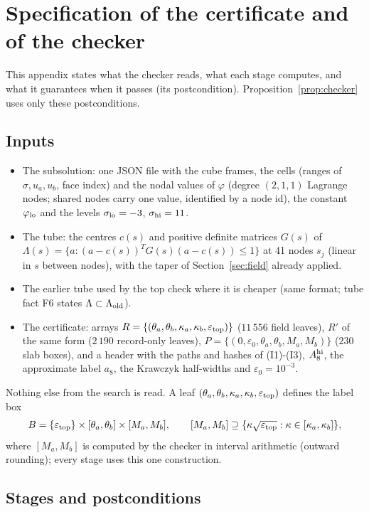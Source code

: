 \section{Specification of the certificate and of the checker}\label{app:spec}
This appendix states what the checker reads, what each stage computes, and what it guarantees when it passes
(its postcondition). Proposition~\ref{prop:checker} uses only these postconditions.

\subsection{Inputs}
\begin{itemize}
\item[(I1)] The subsolution: one JSON file with the cube frames, the cells (ranges of $\sigma,u_a,u_b$, face index) and
the nodal values of $\varphi$ (degree $(2,1,1)$ Lagrange nodes; shared nodes carry one value, identified by a node id),
the constant $\varphi_{\rm lo}$ and the levels $\sigma_{\rm lo}=-3$, $\sigma_{\rm hi}=11$.
\item[(I2)] The tube: the centres $c(s)$ and positive definite matrices $G(s)$ of $\Lambda(s)=\{a:(a-c(s))^TG(s)(a-c(s))\le1\}$
at 41 nodes $s_j$ (linear in $s$ between nodes), with the taper of Section~\ref{sec:field} already applied.
\item[(I3)] The earlier tube used by the top check where it is cheaper (same format; tube fact F6 states $\Lambda\subset\Lambda_{\rm old}$).
\item[(I4)] The certificate: arrays
$R=\{(\theta_a,\theta_b,\kappa_a,\kappa_b,\varepsilon_{\rm top})\}$ ($11\,556$ field leaves),
$R'$ of the same form ($2\,190$ record-only leaves),
$P=\{(0,\varepsilon_0,\theta_a,\theta_b,M_a,M_b)\}$ ($230$ slab boxes),
and a header with the paths and hashes of (I1)-(I3), $A_8^{\rm hi}$, the approximate label $a_8$, the Krawczyk
half-widths and $\varepsilon_0=10^{-3}$.
\end{itemize}
Nothing else from the search is read. A leaf $(\theta_a,\theta_b,\kappa_a,\kappa_b,\varepsilon_{\rm top})$ defines the
label box
\[
B=\{\varepsilon_{\rm top}\}\times[\theta_a,\theta_b]\times[M_a,M_b],\qquad [M_a,M_b]\supseteq\{\kappa\sqrt{\varepsilon_{\rm top}}:
\kappa\in[\kappa_a,\kappa_b]\},
\]
where $[M_a,M_b]$ is computed by the checker in interval arithmetic (outward rounding); every stage uses this one
construction.

\subsection{Stages and postconditions}
